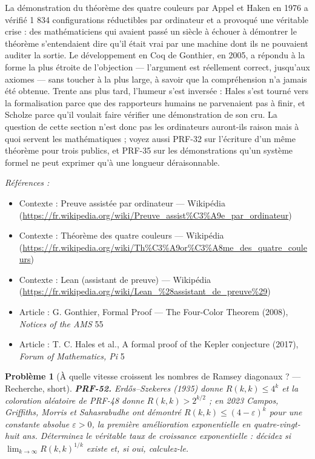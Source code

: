 \documentclass[11pt]{article}
\newtheorem{problem}{Problème}
\newenvironment{refs}{\par\small\noindent\emph{Références :}\begin{itemize}\setlength\itemsep{0pt}}{\end{itemize}\normalsize}
\begin{document}
\noindent La démonstration du théorème des quatre couleurs par Appel et Haken en
1976 a vérifié 1 834 configurations réductibles par ordinateur et a provoqué une véritable
crise : des mathématiciens qui avaient passé un siècle à échouer à démontrer le théorème
s'entendaient dire qu'il était vrai par une machine dont ils ne pouvaient auditer la sortie.
Le développement en Coq de Gonthier, en 2005, a répondu à la forme la plus étroite de
l'objection --- l'argument est réellement correct, jusqu'aux axiomes --- sans toucher à la plus
large, à savoir que la compréhension n'a jamais été obtenue. Trente ans plus tard, l'humeur
s'est inversée : Hales s'est tourné vers la formalisation parce que des rapporteurs humains
ne parvenaient pas à finir, et Scholze parce qu'il voulait faire vérifier une démonstration
de son cru. La question de cette section n'est donc pas \og{} les ordinateurs auront-ils raison \fg{}
mais à quoi servent les mathématiques ; voyez aussi PRF-32 sur l'écriture d'un même théorème
pour trois publics, et PRF-35 sur les démonstrations qu'un système formel ne peut exprimer
qu'à une longueur déraisonnable.

\begin{refs}
\item Contexte : Preuve assistée par ordinateur --- Wikipédia (\url{https://fr.wikipedia.org/wiki/Preuve_assist%C3%A9e_par_ordinateur})
\item Contexte : Théorème des quatre couleurs --- Wikipédia (\url{https://fr.wikipedia.org/wiki/Th%C3%A9or%C3%A8me_des_quatre_couleurs})
\item Contexte : Lean (assistant de preuve) --- Wikipédia (\url{https://fr.wikipedia.org/wiki/Lean_%28assistant_de_preuve%29})
\item Article : G. Gonthier, \og{} Formal Proof --- The Four-Color Theorem \fg{} (2008), \textit{Notices of the AMS} 55
\item Article : T. C. Hales et al., \og{} A formal proof of the Kepler conjecture \fg{} (2017), \textit{Forum of Mathematics, Pi} 5
\end{refs}

\bigskip

\begin{problem}[{À quelle vitesse croissent les nombres de Ramsey diagonaux ? --- Recherche, short}]
\textbf{PRF-52.} Erd\H{o}s--Szekeres (1935) donne
$ R(k,k) \le 4^{k} $ et la coloration aléatoire de PRF-48 donne
$ R(k,k) >2^{k/2} $ ; en 2023 Campos, Griffiths, Morris et Sahasrabudhe ont démontré
$ R(k,k) \le (4-\varepsilon)^{k} $ pour une constante absolue $ \varepsilon >0 $,
la première amélioration exponentielle en quatre-vingt-huit ans. Déterminez le véritable taux
de croissance exponentielle : décidez si $ \lim_{k\to\infty} R(k,k)^{1/k} $ existe et, si
oui, calculez-le.
\end{problem}
\end{document}
